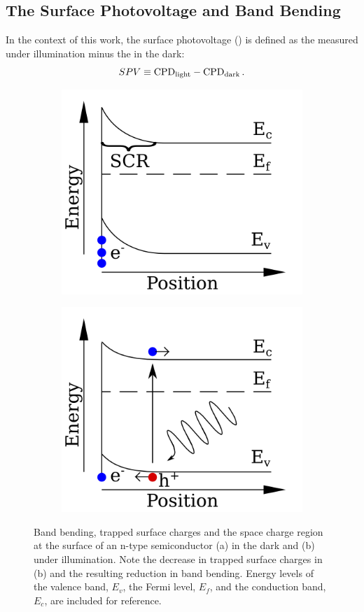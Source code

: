 \subsection{The Surface Photovoltage and Band Bending}
In the context of this work, the surface photovoltage (\spv{}) is defined as the \cpd{} measured under illumination minus the \cpd{} in the dark:
\begin{equation}
\label{spv}
	SPV \equiv \text{CPD}_{\text{light}} - \text{CPD}_{\text{dark}} \, .
\end{equation}
\begin{figure}
\begin{subfigure}{0.5\textwidth}
\centering
	\includegraphics[width=0.8\linewidth]{./figs/bb-dark}
	\caption{}
	\label{fig:bbdark}
\end{subfigure}
\begin{subfigure}{0.5\textwidth}
\centering
	\includegraphics[width=0.8\linewidth]{./figs/bb-light}
	\caption{}
	\label{fig:bblight}
\end{subfigure}
\caption{Band bending, trapped surface charges and the space charge region at the surface of an n-type semiconductor (a) in the dark and (b) under illumination. Note the decrease in trapped surface charges in (b) and the resulting reduction in band bending. Energy levels of the valence band, $E_v$, the Fermi level, $E_f$, and the conduction band, $E_c$, are included for reference.}
\label{fig:bb}
\end{figure}
